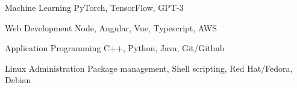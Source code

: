 
\begin{cvskills}
  \cvskill
  {Machine Learning}
  {PyTorch, TensorFlow, GPT-3}
  
  \cvskill
  	{Web Development}
  	{Node, Angular, Vue, Typescript, AWS}
  
  \cvskill
  	{Application Programming}
  	{C++, Python, Java, Git/Github}
  	
  \cvskill
  	{Linux Administration}
  	{Package management, Shell scripting, Red Hat/Fedora, Debian}
\end{cvskills}
